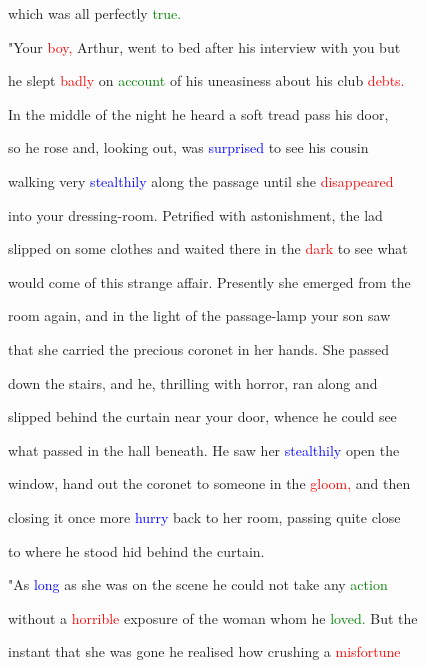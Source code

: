  which was all perfectly \textcolor{green}{true.}



 "Your \textcolor{red}{boy,} Arthur, went to bed after his interview with you but

 he slept \textcolor{red}{badly} on \textcolor{green}{account} of his \textcolor{BurntOrange}{uneasiness} about his club \textcolor{red}{debts.}

 In the middle of the night he heard a soft tread pass his door,

 so he rose and, looking out, was \textcolor{blue}{surprised} to see his cousin

 walking very \textcolor{blue}{stealthily} along the passage until she \textcolor{red}{disappeared}

 into your dressing-room. Petrified with \textcolor{BurntOrange}{astonishment,} the lad

 \textcolor{BurntOrange}{slipped} on some clothes and \textcolor{BurntOrange}{waited} there in the \textcolor{red}{dark} to see what

 would come of this strange affair. Presently she emerged from the

 room again, and in the light of the passage-lamp your son saw

 that she carried the \textcolor{BurntOrange}{precious} coronet in her hands. She passed

 down the stairs, and he, \textcolor{BurntOrange}{thrilling} with \textcolor{BurntOrange}{horror,} ran along and

 \textcolor{BurntOrange}{slipped} behind the curtain near your door, whence he could see

 what passed in the hall beneath. He saw her \textcolor{blue}{stealthily} open the

 window, hand out the coronet to someone in the \textcolor{red}{gloom,} and then

 closing it once more \textcolor{blue}{hurry} back to her room, passing quite close

 to where he stood hid behind the curtain.



 "As \textcolor{blue}{long} as she was on the scene he could not take any \textcolor{green}{action}

 without a \textcolor{red}{horrible} exposure of the woman whom he \textcolor{green}{loved.} But the

 instant that she was gone he realised how crushing a \textcolor{red}{misfortune}

